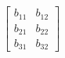 \documentclass[preview]{standalone}
\begin{document}
\begin{align*}
\begin{bmatrix} b_{11} & b_{12} \\ b_{21} & b_{22} \\ b_{31} & b_{32} \end{bmatrix}
\end{align*}
\end{document}
